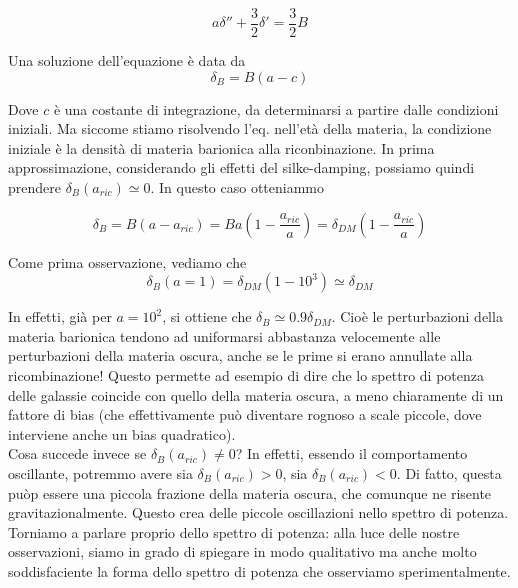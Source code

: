\documentclass{report}
\begin{document}
\begin{equation}
    a\delta'' + \frac{3}{2}\delta' = \frac{3}{2}B
\end{equation}

Una soluzione dell'equazione è data da 
\begin{equation}
    \delta_B = B(a - c)
\end{equation}

Dove $c$ è una costante di integrazione, da determinarsi a partire dalle condizioni iniziali. Ma siccome stiamo risolvendo l'eq. nell'età della materia, la condizione iniziale è la densità di materia barionica alla riconbinazione. In prima approssimazione, considerando gli effetti del silke-damping, possiamo quindi prendere $\delta_B(a_{ric}) \simeq 0$. In questo caso otteniammo 

\begin{tcolorbox}[colback=gray!15, colframe=black, boxrule=1pt]
\begin{equation}
    \delta_B = B(a - a_{ric}) = Ba\left(1 - \frac{a_{ric}}{a}\right) = \delta_{DM}\left(1 - \frac{a_{ric}}{a}\right)
\end{equation}
\end{tcolorbox}

Come prima osservazione, vediamo che 
\begin{equation}
    \delta_{B}(a=1) = \delta_{DM}(1 - 10^3) \simeq \delta_{DM}
\end{equation}

In effetti, già per $a=10^{2}$, si ottiene che $\delta_B \simeq 0.9\delta_{DM}$. Cioè le perturbazioni della materia barionica tendono ad uniformarsi abbastanza velocemente alle perturbazioni della materia oscura, anche se le prime si erano annullate alla ricombinazione! Questo permette ad esempio di dire che lo spettro di potenza delle galassie coincide con quello della materia oscura, a meno chiaramente di un fattore di bias (che effettivamente può diventare rognoso a scale piccole, dove interviene anche un bias quadratico). \\

Cosa succede invece se $\delta_B(a_{ric}) \neq 0$? In effetti, essendo il comportamento oscillante, potremmo avere sia $\delta_B(a_{ric}) >0$, sia $\delta_B(a_{ric}) <0$. Di fatto, questa puòp essere una piccola frazione della materia oscura, che comunque ne risente gravitazionalmente. Questo crea delle piccole oscillazioni nello spettro di potenza. \\

Torniamo a parlare proprio dello spettro di potenza: alla luce delle nostre osservazioni, siamo in grado di spiegare in modo qualitativo ma anche molto soddisfaciente la forma dello spettro di potenza che osserviamo sperimentalmente. \\
\end{document}
